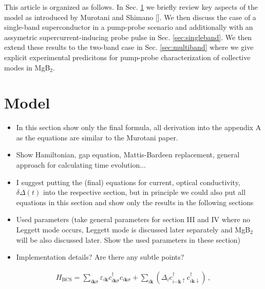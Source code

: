 \documentclass[aps,prb,reprint,noeprint,superscriptaddress]{revtex4-1}
\begin{document}
This article is organized as follows. In Sec. \ref{sec:model} we briefly review
key aspects of the model as introduced by Murotani and Shimano []. We then
discuss the case of a single-band superconductor in a pump-probe scenario and
additionally with an assymetric supercurrent-inducing probe pulse in Sec.
\ref{sec:singleband}. We then extend these results to the two-band case in Sec.
\ref{sec:multiband} where we give explicit experimental predicitons for
pump-probe characterization of collective modes in MgB$_2$.







\section{Model}
\label{sec:model}

\begin{itemize}
	\item In this section show only the final formula, all derivation into the appendix A as the equations are similar to the Murotani paper.
	\item Show Hamiltonian, gap equation, Mattis-Bardeen replacement, general approach for calculating time evolution...
	\item I suggest putting the (final) equations for current, optical conductivity, $\delta\Delta(t)$ into the respective section, but in principle we could also put all equations in this section and show only the results in the following sections

	\item Used parameters (take general parameters for section III and IV where no Leggett mode occurs, Leggett mode is discussed later separately and MgB$_2$ will be also discussed later. Show the used parameters in these section)
	\item Implementation details? Are there any subtle points?
\end{itemize}


\begin{eqnarray}
	H_{\text{BCS}} = \sum_{i\mathbf{k}\sigma}  
	\varepsilon_{i\mathbf{k}}c_{i\mathbf{k}\sigma}^\dagger
	c_{i\mathbf{k}\sigma} + \sum_{i\mathbf{k}}^{}
	\left( \Delta_i c_{i\mathbf{-k}\uparrow }^\dagger
	c_{i\mathbf{k}\downarrow }^\dagger  \right) \,,
\end{eqnarray}
\end{document}

